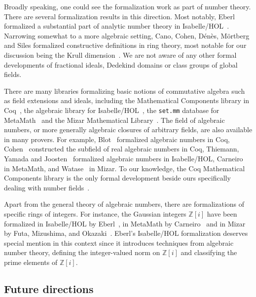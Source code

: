 \documentclass[sn-mathphys]{sn-jnl}%
\renewcommand{\Z}{\mathbb{Z}}
\begin{document}
Broadly speaking, one could see the formalization work as part of number theory. There are several formalization results in this direction.
Most notably, Eberl formalized a substantial part of analytic number theory in Isabelle/HOL~\cite{Eberl19}.
Narrowing somewhat to a more algebraic setting,
Cano, Cohen, Dénès, Mörtberg and Siles formalized constructive definitions in ring theory, most notable for our discussion being the Krull dimension~\cite{linear-algebra-coq}.
We are not aware of any other formal developments of fractional ideals, Dedekind domains or class groups of global fields.

There are many libraries formalizing basic notions of commutative algebra such as field extensions and ideals, including the Mathematical Components library in Coq~\cite{mathcomp},
the algebraic library for Isabelle/HOL~\cite{algebra_isabelle},
the \texttt{set.mm} database for MetaMath~\cite{metamath} and the Mizar Mathematical Library~\cite{algebraic-hierarchy_mizar}.
The field of algebraic numbers, or more generally algebraic closures of arbitrary fields, are also available in many provers.
For example, Blot~\cite{algebraic-numbers-ccorn} formalized algebraic numbers in Coq,
Cohen~\cite{real-algebraic-numbers-coq} constructed the subfield of real algebraic numbers in Coq,
Thiemann, Yamada and Joosten~\cite{algebraic-numbers-isabelle} formalized algebraic numbers in Isabelle/HOL,
Carneiro~\cite{algebraic-numbers-metamath} in MetaMath,
and Watase~\cite{algebraic-numbers-mizar} in Mizar.
To our knowledge, the Coq Mathematical Components library is the only formal development beside ours specifically dealing with number fields~\cite[\texttt{field/algnum.v}]{mathcomp}.

Apart from the general theory of algebraic numbers, there are formalizations of specific rings of integers.
For instance, the Gaussian integers $\Z[i]$ have been formalized
in Isabelle/HOL by Eberl~\cite{gaussian_integers-isabelle},
in MetaMath by Carneiro~\cite{gaussian_integers-metamath}
and in Mizar by Futa, Mizushima, and Okazaki~\cite{gaussian_integers-mizar}.
Eberl's Isabelle/HOL formalization deserves special mention in this context since it introduces techniques from algebraic number theory,
defining the integer-valued norm on $\Z[i]$ and classifying the prime elements of $\Z[i]$.

\subsection{Future directions}\label{sec:future_directions}
\end{document}
